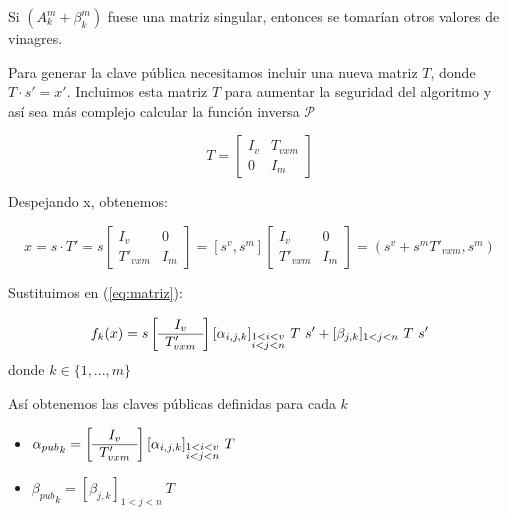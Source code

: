 \documentclass[11pt]{article}
\begin{document}
Si $(A_k^m + \beta_k^m)$ fuese una matriz singular, entonces se tomarían otros valores de vinagres.


Para generar la clave pública necesitamos incluir una nueva matriz $T$, donde $T \cdot s' = x'$. Incluimos esta matriz $T$ para aumentar la seguridad del algoritmo y así sea más complejo calcular la función inversa $\mathcal{P}$

\begin{equation}
	T =
	\left[
	\begin{array}{c|c}
	I_v & T_{vxm} \\
	\hline
	0 & I_m
	\end{array}
	\right]
	\label{mat:T}
\end{equation}

Despejando x, obtenemos:

\begin{equation}
	x =  s \cdot T' = s  \left[
	\begin{array}{c|c}
	I_v & 0 \\
	\hline
	T'_{v x m} & I_m
	\end{array}
	\right]
	= [s^v, s^m] \left[
	\begin{array}{c|c}
	I_v & 0 \\
	\hline
	T'_{v x m} & I_m
	\end{array}
	\right]
	= (s^v + s^m T'_{vxm}, s^m )
\end{equation}

Sustituimos en (\ref{eq:matriz}):

\begin{equation}
	f_k(x) = s  \left[
	\begin{array}{c}
	I_v \\
	\hline
	T'_{v x m}
	\end{array}
	\right] [\alpha_{i,j,k}]_{\begin{subarray}{l}{1<i<v }\\ {i<j<n}\end{subarray}}\ T \ s' + [\beta_{j,k}]_{1<j<n}\ T\ s'
\end{equation}
donde $k \in \{1,...,m\}$

Así obtenemos las claves públicas definidas para cada $k$

\begin{itemize}
	\item ${\alpha_{pub}}_k = \left[
	\begin{array}{c}
	I_v \\
	\hline
	T'_{v x m}
	\end{array}
	\right] [\alpha_{i,j,k}]_{\begin{subarray}{l}{1<i<v }\\ {i<j<n}\end{subarray}} \ T$
	
	\item ${\beta_{pub}}_k = [\beta_{j,k}]_{1<j<n}\ T$

\end{itemize}
\end{document}

